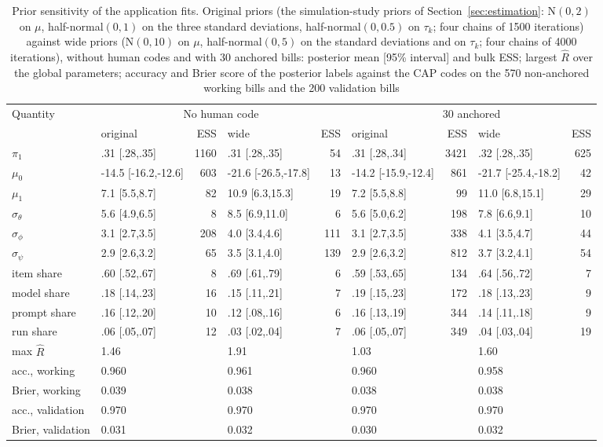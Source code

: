 \begin{table}[htbp]
\centering
\tiny
\setlength{\tabcolsep}{2.5pt}
\caption{Prior sensitivity of the application fits. Original priors (the simulation-study priors of Section~\ref{sec:estimation}: $\mathrm{N}(0, 2)$ on $\mu$, half-normal$(0, 1)$ on the three standard deviations, half-normal$(0, 0.5)$ on $\tau_k$; four chains of 1500 iterations) against wide priors ($\mathrm{N}(0, 10)$ on $\mu$, half-normal$(0, 5)$ on the standard deviations and on $\tau_k$; four chains of 4000 iterations), without human codes and with 30 anchored bills: posterior mean [95\% interval] and bulk ESS; largest $\widehat{R}$ over the global parameters; accuracy and Brier score of the posterior labels against the CAP codes on the 570 non-anchored working bills and the 200 validation bills}\label{tab:prior_sens}
\begin{tabular}{llrlrlrlr}
\toprule
Quantity & \multicolumn{4}{c}{No human code} & \multicolumn{4}{c}{30 anchored} \\
\cmidrule(lr){2-5}\cmidrule(lr){6-9}
 & original & ESS & wide & ESS & original & ESS & wide & ESS \\
\midrule
$\pi_1$ & .31 [.28,.35] & 1160 & .31 [.28,.35] & 54 & .31 [.28,.34] & 3421 & .32 [.28,.35] & 625 \\
$\mu_0$ & -14.5 [-16.2,-12.6] & 603 & -21.6 [-26.5,-17.8] & 13 & -14.2 [-15.9,-12.4] & 861 & -21.7 [-25.4,-18.2] & 42 \\
$\mu_1$ & 7.1 [5.5,8.7] & 82 & 10.9 [6.3,15.3] & 19 & 7.2 [5.5,8.8] & 99 & 11.0 [6.8,15.1] & 29 \\
$\sigma_\theta$ & 5.6 [4.9,6.5] & 8 & 8.5 [6.9,11.0] & 6 & 5.6 [5.0,6.2] & 198 & 7.8 [6.6,9.1] & 10 \\
$\sigma_\phi$ & 3.1 [2.7,3.5] & 208 & 4.0 [3.4,4.6] & 111 & 3.1 [2.7,3.5] & 338 & 4.1 [3.5,4.7] & 44 \\
$\sigma_\psi$ & 2.9 [2.6,3.2] & 65 & 3.5 [3.1,4.0] & 139 & 2.9 [2.6,3.2] & 812 & 3.7 [3.2,4.1] & 54 \\
item share & .60 [.52,.67] & 8 & .69 [.61,.79] & 6 & .59 [.53,.65] & 134 & .64 [.56,.72] & 7 \\
model share & .18 [.14,.23] & 16 & .15 [.11,.21] & 7 & .19 [.15,.23] & 172 & .18 [.13,.23] & 9 \\
prompt share & .16 [.12,.20] & 10 & .12 [.08,.16] & 6 & .16 [.13,.19] & 344 & .14 [.11,.18] & 9 \\
run share & .06 [.05,.07] & 12 & .03 [.02,.04] & 7 & .06 [.05,.07] & 349 & .04 [.03,.04] & 19 \\
max $\widehat{R}$ & 1.46 &  & 1.91 &  & 1.03 &  & 1.60 &  \\
acc., working & 0.960 &  & 0.961 &  & 0.960 &  & 0.958 &  \\
Brier, working & 0.039 &  & 0.038 &  & 0.038 &  & 0.038 &  \\
acc., validation & 0.970 &  & 0.970 &  & 0.970 &  & 0.970 &  \\
Brier, validation & 0.031 &  & 0.032 &  & 0.030 &  & 0.032 &  \\
\bottomrule
\end{tabular}
\end{table}
